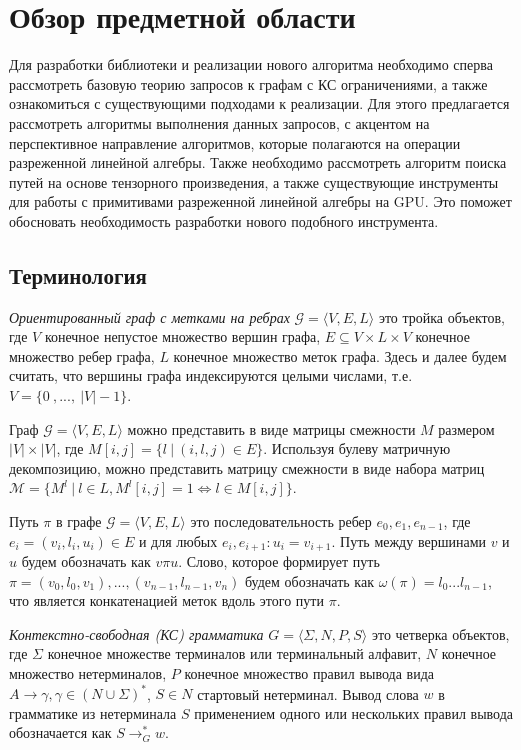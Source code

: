 \section{Обзор предметной области}

Для разработки библиотеки и реализации нового алгоритма необходимо сперва рассмотреть базовую теорию запросов к графам с КС ограничениями, а также ознакомиться с существующими подходами к реализации.
Для этого предлагается рассмотреть алгоритмы выполнения данных запросов, с акцентом на перспективное направление алгоритмов, которые полагаются на операции разреженной линейной алгебры. Также необходимо рассмотреть алгоритм поиска путей на основе тензорного произведения, а также существующие инструменты для работы с примитивами разреженной линейной алгебры на GPU. Это поможет обосновать необходимость разработки нового подобного инструмента.

\subsection{Терминология}

    
\textit{Ориентированный граф с метками на ребрах} $\mathcal{G} = \langle V, E, L \rangle$ это тройка объектов, где $V$ конечное непустое множество вершин графа, $E \subseteq V \times L \times V$ конечное множество ребер графа, $L$ конечное множество меток графа. Здесь и далее будем считать, что вершины графа индексируются целыми числами, т.е. $V = \{0~,...,~|V| - 1\}$.

Граф $\mathcal{G} = \langle V, E, L \rangle$ можно представить в виде матрицы смежности $M$ размером $|V| \times |V|$, где $M[i,j] = \{l~|~(i,l,j) \in E\}$. Используя булеву матричную декомпозицию, можно представить матрицу смежности в виде набора матриц $\mathcal{M} = \{ M^l ~|~ l \in L, M^l[i,j] = 1 \iff l \in M[i,j]\}$.

Путь $\pi$ в графе $\mathcal{G} = \langle V, E, L \rangle$ это последовательность ребер $e_0,e_1,e_{n-1}$, где $e_i = (v_i, l_i, u_i) \in E$ и для любых $e_i, e_{i+1}: u_i = v_{i+1}$. Путь между вершинами $v$ и $u$ будем обозначать как $v \pi u$. Слово, которое формирует путь $\pi = (v_0, l_0, v_1), ... ,(v_{n-1}, l_{n-1}, v_n)$ будем обозначать как $\omega (\pi) = l_0 ... l_{n-1}$, что является конкатенацией меток вдоль этого пути $\pi$.

\textit{Контекстно-свободная (КС) грамматика} $G = \langle \Sigma, N, P, S \rangle$ это четверка объектов, где $\Sigma$ конечное множестве терминалов или терминальный алфавит, $N$ конечное множество нетерминалов, $P$ конечное множество правил вывода вида $A \rightarrow \gamma, \gamma \in (N \cup \Sigma)^*$, $S \in N$ стартовый нетерминал. Вывод слова $w$ в грамматике из нетерминала $S$ применением одного или нескольких правил вывода обозначается как $S \rightarrow^*_G w$.

